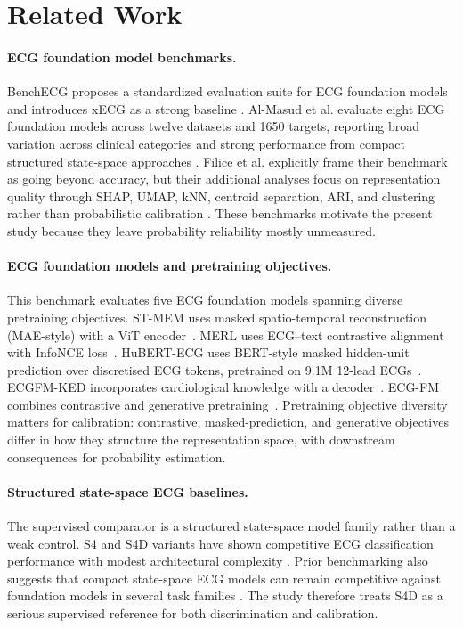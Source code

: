 \section{Related Work}
\label{sec:related_work}

\paragraph{ECG foundation model benchmarks.}
BenchECG proposes a standardized evaluation suite for ECG foundation models and introduces xECG as a strong baseline \citep{lunelli2025benchecg}. Al-Masud et al. evaluate eight ECG foundation models across twelve datasets and 1650 targets, reporting broad variation across clinical categories and strong performance from compact structured state-space approaches \citep{almasud2025benchmarking}. Filice et al. explicitly frame their benchmark as going beyond accuracy, but their additional analyses focus on representation quality through SHAP, UMAP, kNN, centroid separation, ARI, and clustering rather than probabilistic calibration \citep{filice2026beyond}. These benchmarks motivate the present study because they leave probability reliability mostly unmeasured.

\paragraph{ECG foundation models and pretraining objectives.}
This benchmark evaluates five ECG foundation models spanning diverse pretraining objectives.
ST-MEM uses masked spatio-temporal reconstruction (MAE-style) with a ViT encoder~\citep{na2024stmem}.
MERL uses ECG--text contrastive alignment with InfoNCE loss~\citep{liu2024merl}.
HuBERT-ECG uses BERT-style masked hidden-unit prediction over discretised ECG tokens,
pretrained on 9.1M 12-lead ECGs~\citep{hubertecg2024}.
ECGFM-KED incorporates cardiological knowledge with a decoder~\citep{ecgfmked2024}.
ECG-FM combines contrastive and generative pretraining~\citep{mckeen2024ecgfm}.
Pretraining objective diversity matters for calibration: contrastive, masked-prediction,
and generative objectives differ in how they structure the representation space,
with downstream consequences for probability estimation.

\paragraph{Structured state-space ECG baselines.}
The supervised comparator is a structured state-space model family rather than a weak control. S4 and S4D variants have shown competitive ECG classification performance with modest architectural complexity \citep{gu2022s4ecg, s4d2024ecg}. Prior benchmarking also suggests that compact state-space ECG models can remain competitive against foundation models in several task families \citep{almasud2025benchmarking}. The study therefore treats S4D as a serious supervised reference for both discrimination and calibration.

